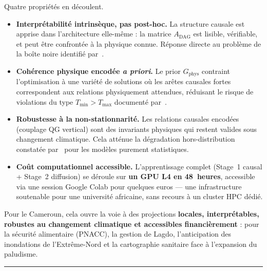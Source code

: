 \documentclass[12pt,a4paper]{article}
\begin{document}
Quatre propriétés en découlent.

\begin{itemize}[leftmargin=1.2em, itemsep=3pt]
    \item \textbf{Interprétabilité intrinsèque, pas post-hoc.} La structure causale est apprise dans l'architecture elle-même : la matrice $A_{\text{DAG}}$ est lisible, vérifiable, et peut être confrontée à la physique connue. Réponse directe au problème de la boîte noire identifié par~\cite{Doury2023,GonzalezAbad2023XAI}.
    \item \textbf{Cohérence physique encodée \emph{a priori}.} Le prior $G_{\text{phys}}$ contraint l'optimisation à une variété de solutions où les arêtes causales fortes correspondent aux relations physiquement attendues, réduisant le risque de violations du type $T_{\min}>T_{\max}$ documenté par~\cite{GonzalezAbad2023AAAI}.
    \item \textbf{Robustesse à la non-stationnarité.} Les relations causales encodées (couplage QG vertical) sont des invariants physiques qui restent valides sous changement climatique. Cela atténue la dégradation hors-distribution constatée par~\cite{Doury2023} pour les modèles purement statistiques.
    \item \textbf{Coût computationnel accessible.} L'apprentissage complet (Stage~1 causal + Stage~2 diffusion) se déroule sur \textbf{un GPU L4 en 48~heures}, accessible via une session Google Colab pour quelques euros --- une infrastructure soutenable pour une université africaine, sans recours à un cluster HPC dédié.
\end{itemize}

Pour le Cameroun, cela ouvre la voie à des projections \textbf{locales, interprétables, robustes au changement climatique et accessibles financièrement} : pour la sécurité alimentaire (PNACC), la gestion de Lagdo, l'anticipation des inondations de l'Extrême-Nord et la cartographie sanitaire face à l'expansion du paludisme.

\vspace{0.6em}
\hrule
\vspace{0.4em}
\end{document}

